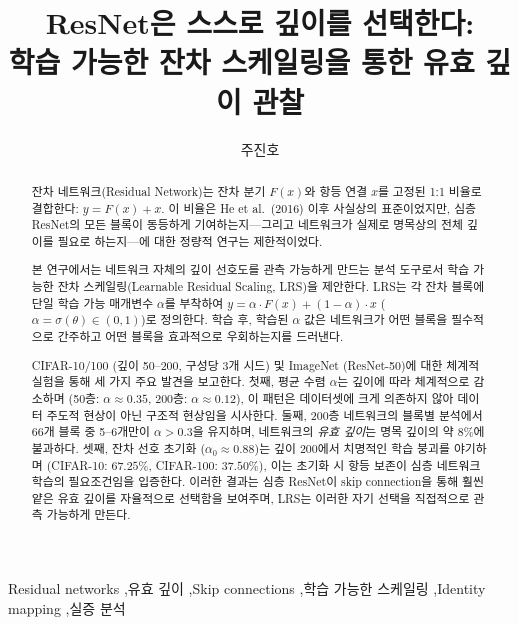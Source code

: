 \documentclass[preprint,12pt]{elsarticle}
\begin{document}
\begin{frontmatter}

\title{ResNet은 스스로 깊이를 선택한다:\\학습 가능한 잔차 스케일링을 통한 유효 깊이 관찰}

\author[suwon]{주진호}


\begin{abstract}
잔차 네트워크(Residual Network)는 잔차 분기 $F(x)$와 항등 연결 $x$를 고정된 1:1 비율로 결합한다: $y = F(x) + x$. 이 비율은 He et al.\ (2016) 이후 사실상의 표준이었지만, 심층 ResNet의 모든 블록이 동등하게 기여하는지---그리고 네트워크가 실제로 명목상의 전체 깊이를 필요로 하는지---에 대한 정량적 연구는 제한적이었다.

본 연구에서는 네트워크 자체의 깊이 선호도를 관측 가능하게 만드는 분석 도구로서 학습 가능한 잔차 스케일링(Learnable Residual Scaling, LRS)을 제안한다. LRS는 각 잔차 블록에 단일 학습 가능 매개변수 $\alpha$를 부착하여 $y = \alpha \cdot F(x) + (1 - \alpha) \cdot x$ ($\alpha = \sigma(\theta) \in (0,1)$)로 정의한다. 학습 후, 학습된 $\alpha$ 값은 네트워크가 어떤 블록을 필수적으로 간주하고 어떤 블록을 효과적으로 우회하는지를 드러낸다.

CIFAR-10/100 (깊이 50--200, 구성당 3개 시드) 및 ImageNet (ResNet-50)에 대한 체계적 실험을 통해 세 가지 주요 발견을 보고한다. 첫째, 평균 수렴 $\alpha$는 깊이에 따라 체계적으로 감소하며 (50층: $\alpha \approx 0.35$, 200층: $\alpha \approx 0.12$), 이 패턴은 데이터셋에 크게 의존하지 않아 데이터 주도적 현상이 아닌 구조적 현상임을 시사한다. 둘째, 200층 네트워크의 블록별 분석에서 66개 블록 중 5--6개만이 $\alpha > 0.3$을 유지하며, 네트워크의 \emph{유효 깊이}는 명목 깊이의 약 8\%에 불과하다. 셋째, 잔차 선호 초기화 ($\alpha_0 \approx 0.88$)는 깊이 200에서 치명적인 학습 붕괴를 야기하며 (CIFAR-10: $67.25\%$, CIFAR-100: $37.50\%$), 이는 초기화 시 항등 보존이 심층 네트워크 학습의 필요조건임을 입증한다. 이러한 결과는 심층 ResNet이 skip connection을 통해 훨씬 얕은 유효 깊이를 자율적으로 선택함을 보여주며, LRS는 이러한 자기 선택을 직접적으로 관측 가능하게 만든다.
\end{abstract}

\begin{keyword}
Residual networks \sep 유효 깊이 \sep Skip connections \sep 학습 가능한 스케일링 \sep Identity mapping \sep 실증 분석
\end{keyword}

\end{frontmatter}
\end{document}

